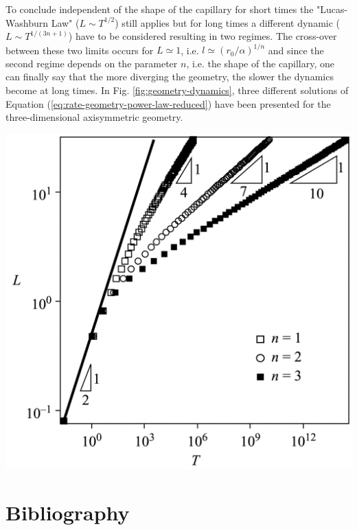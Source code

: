 \documentclass[aip, amsmath, amssymb, reprint, twocolumn, floatfix]{revtex4-1}
\begin{document}
To conclude independent of the shape of the capillary for short times the "Lucas-Washburn Law" ($L \sim T^{1/2}$) still applies but for long times a different dynamic ($L \sim T^{1/(3n+1)}$) have to be considered resulting in two regimes. The cross-over between these two limits occurs for $L \simeq 1$, i.e. $l \simeq (r_0/\alpha)^{1/n}$ and since the second regime depends on the parameter $n$, i.e. the shape of the capillary, one can finally say that the more diverging the geometry, the slower the dynamics become at long times.  In Fig. \ref{fig:geometry-dynamics}, three different solutions of Equation (\ref{eq:rate-geometry-power-law-reduced}) have been presented for the three-dimensional axisymmetric geometry.
\begin{center}
	\captionsetup{type=figure}
	\includegraphics[width = \linewidth]{../pictures/Geometry-Dynamics.png}
	\label{fig:geometry-dynamics}
\end{center}


\section{Bibliography}
\end{document}
